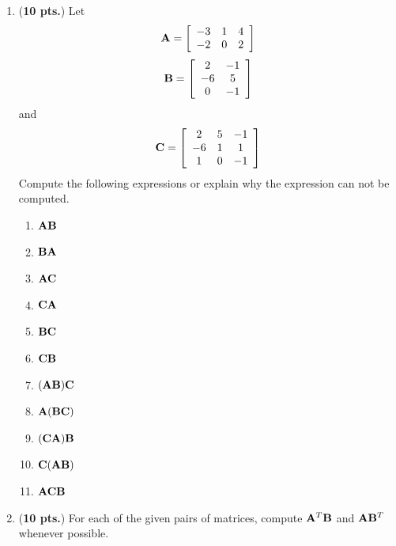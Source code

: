 \documentclass[13pt]{article}\usepackage[]{graphicx}\usepackage[]{color}
\begin{document}
{\begin{enumerate}
    \item ({\bf 10 pts.}) Let
    \[ {\bf A} = \left[\begin{array}{ccc} -3 & 1 & 4 \\ -2 &  0 & 2 \end{array}\right]  \]
    \[ {\bf B} = \left[\begin{array}{cc} 2 & -1 \\ -6 & 5 \\ 0 & -1 \end{array}\right]  \]
    and
    \[ {\bf C} = \left[\begin{array}{ccc} 2 & 5 & -1\\ -6 & 1 & 1 \\1 & 0 & -1 \end{array}\right]  \]
    Compute the following expressions or explain why the expression can not be computed. 
    \begin{enumerate}
        \item ${\bf AB}$
        \item ${\bf BA}$
        \item ${\bf AC}$
        \item ${\bf CA}$
        \item ${\bf BC}$
        \item ${\bf CB}$
        \item $({\bf AB}){\bf C}$
        \item ${\bf A}({\bf BC})$
        \item $({\bf CA}){\bf B}$
        \item ${\bf C}({\bf AB})$
        \item ${\bf ACB}$
    \end{enumerate}
    
    \newpage 
    
  \item ({\bf 10 pts.}) For each of the given pairs of matrices, compute ${\bf A}^{T}{\bf B}$ and ${\bf A}{\bf B}^{T}$ whenever possible. 
  

\end{enumerate}}
\end{document}
